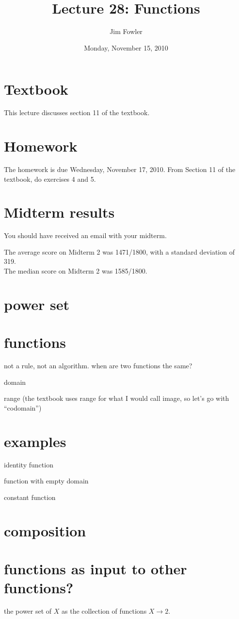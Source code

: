 \documentclass[12pt]{handout}
\title{Lecture 28: Functions}
\author{Jim Fowler}
\date{Monday, November 15, 2010}
\begin{document}
\maketitle

\section*{Textbook}

This lecture discusses section 11 of the textbook.

\section*{Homework} 

The homework is due Wednesday, November 17, 2010.
From Section 11 of the textbook, do exercises 4 and 5.

\section*{Midterm results}

You should have received an email with your midterm.

The average score on Midterm 2 was 1471/1800, with a standard deviation of 319. \\
The median score on Midterm 2 was 1585/1800.

\section*{power set}

\section*{functions}

not a rule, not an algorithm.  when are two functions the same?

domain

range (the textbook uses range for what I would call image, so let's go with ``codomain'')

\section*{examples}

identity function

function with empty domain

constant function

\section*{composition}

\section*{functions as input to other functions?}

the power set of $X$ as the collection of functions $X \to 2$.
\end{document}
